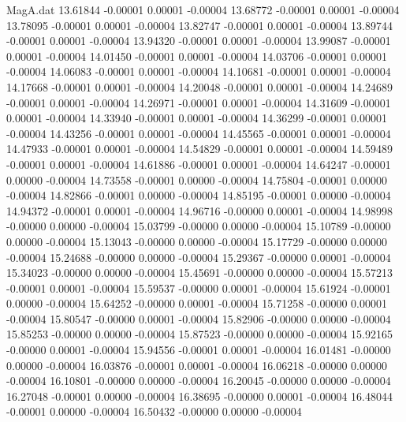 \begin{filecontents}{MagA.dat}
  13.61844   -0.00001    0.00001   -0.00004
  13.68772   -0.00001    0.00001   -0.00004
  13.78095   -0.00001    0.00001   -0.00004
  13.82747   -0.00001    0.00001   -0.00004
  13.89744   -0.00001    0.00001   -0.00004
  13.94320   -0.00001    0.00001   -0.00004
  13.99087   -0.00001    0.00001   -0.00004
  14.01450   -0.00001    0.00001   -0.00004
  14.03706   -0.00001    0.00001   -0.00004
  14.06083   -0.00001    0.00001   -0.00004
  14.10681   -0.00001    0.00001   -0.00004
  14.17668   -0.00001    0.00001   -0.00004
  14.20048   -0.00001    0.00001   -0.00004
  14.24689   -0.00001    0.00001   -0.00004
  14.26971   -0.00001    0.00001   -0.00004
  14.31609   -0.00001    0.00001   -0.00004
  14.33940   -0.00001    0.00001   -0.00004
  14.36299   -0.00001    0.00001   -0.00004
  14.43256   -0.00001    0.00001   -0.00004
  14.45565   -0.00001    0.00001   -0.00004
  14.47933   -0.00001    0.00001   -0.00004
  14.54829   -0.00001    0.00001   -0.00004
  14.59489   -0.00001    0.00001   -0.00004
  14.61886   -0.00001    0.00001   -0.00004
  14.64247   -0.00001    0.00000   -0.00004
  14.73558   -0.00001    0.00000   -0.00004
  14.75804   -0.00001    0.00000   -0.00004
  14.82866   -0.00001    0.00000   -0.00004
  14.85195   -0.00001    0.00000   -0.00004
  14.94372   -0.00001    0.00001   -0.00004
  14.96716   -0.00000    0.00001   -0.00004
  14.98998   -0.00000    0.00000   -0.00004
  15.03799   -0.00000    0.00000   -0.00004
  15.10789   -0.00000    0.00000   -0.00004
  15.13043   -0.00000    0.00000   -0.00004
  15.17729   -0.00000    0.00000   -0.00004
  15.24688   -0.00000    0.00000   -0.00004
  15.29367   -0.00000    0.00001   -0.00004
  15.34023   -0.00000    0.00000   -0.00004
  15.45691   -0.00000    0.00000   -0.00004
  15.57213   -0.00001    0.00001   -0.00004
  15.59537   -0.00000    0.00001   -0.00004
  15.61924   -0.00001    0.00000   -0.00004
  15.64252   -0.00000    0.00001   -0.00004
  15.71258   -0.00000    0.00001   -0.00004
  15.80547   -0.00000    0.00001   -0.00004
  15.82906   -0.00000    0.00000   -0.00004
  15.85253   -0.00000    0.00000   -0.00004
  15.87523   -0.00000    0.00000   -0.00004
  15.92165   -0.00000    0.00001   -0.00004
  15.94556   -0.00001    0.00001   -0.00004
  16.01481   -0.00000    0.00000   -0.00004
  16.03876   -0.00001    0.00001   -0.00004
  16.06218   -0.00000    0.00000   -0.00004
  16.10801   -0.00000    0.00000   -0.00004
  16.20045   -0.00000    0.00000   -0.00004
  16.27048   -0.00001    0.00000   -0.00004
  16.38695   -0.00000    0.00001   -0.00004
  16.48044   -0.00001    0.00000   -0.00004
  16.50432   -0.00000    0.00000   -0.00004

\end{filecontents}
